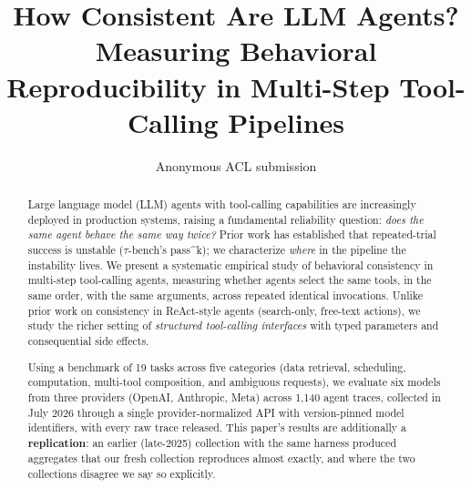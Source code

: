 \documentclass[11pt]{article}
\title{How Consistent Are LLM Agents? Measuring Behavioral
Reproducibility in Multi-Step Tool-Calling Pipelines}
\author{Anonymous ACL submission}
\newcommand{\passk}{pass\textasciicircum k}
\begin{document}
\maketitle
\begin{abstract}
Large language model (LLM) agents with tool-calling capabilities are increasingly
deployed in production systems, raising a fundamental reliability question:
\emph{does the same agent behave the same way twice?} Prior work has
established that repeated-trial success is unstable ($\tau$-bench's \passk);
we characterize \emph{where} in the pipeline the instability lives.
We present a systematic empirical study of behavioral consistency in
multi-step tool-calling agents, measuring whether agents select the same tools,
in the same order, with the same arguments, across repeated identical invocations.
Unlike prior work on consistency in ReAct-style agents (search-only, free-text
actions), we study the richer setting of \emph{structured tool-calling interfaces}
with typed parameters and consequential side effects.

Using a benchmark of 19 tasks across five categories (data retrieval, scheduling,
computation, multi-tool composition, and ambiguous requests), we evaluate six
models from three providers (OpenAI, Anthropic, Meta) across 1,140 agent traces,
collected in July 2026 through a single provider-normalized API with
version-pinned model identifiers, with every raw trace released. This
paper's results are additionally a \textbf{replication}: an earlier (late-2025)
collection with the same harness produced aggregates that our fresh collection
reproduces almost exactly, and where the two collections disagree we say so
explicitly.


\end{abstract}
\end{document}
